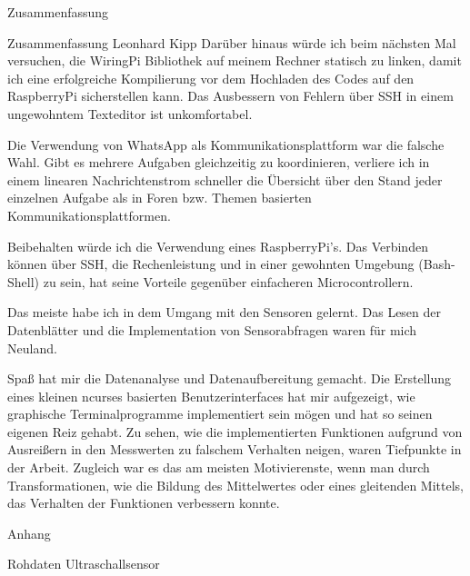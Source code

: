 \documentclass[12pt]{report}
\begin{document}
\begin{section}{Zusammenfassung}
\begin{subsection}{Zusammenfassung Leonhard Kipp}
    Darüber hinaus würde ich beim nächsten Mal versuchen, die WiringPi
    Bibliothek auf meinem Rechner statisch zu linken, damit ich eine
    erfolgreiche Kompilierung vor dem Hochladen des Codes auf den RaspberryPi
    sicherstellen kann. Das Ausbessern von Fehlern über SSH in einem ungewohntem
    Texteditor ist unkomfortabel.

    Die Verwendung von WhatsApp als Kommunikationsplattform war die falsche
    Wahl. Gibt es mehrere Aufgaben gleichzeitig zu koordinieren, verliere ich in
    einem linearen Nachrichtenstrom schneller die Übersicht über den Stand jeder
    einzelnen Aufgabe als in Foren bzw. Themen basierten Kommunikationsplattformen.

    Beibehalten würde ich die Verwendung eines RaspberryPi's. Das Verbinden
    können über SSH, die Rechenleistung und in einer gewohnten Umgebung
    (Bash-Shell) zu sein, hat seine Vorteile gegenüber einfacheren Microcontrollern.

    Das meiste habe ich in dem Umgang mit den Sensoren gelernt. Das Lesen der
    Datenblätter und die Implementation von Sensorabfragen waren für mich Neuland.

    Spaß hat mir die Datenanalyse und Datenaufbereitung gemacht. Die Erstellung
    eines kleinen ncurses basierten Benutzerinterfaces hat mir aufgezeigt, wie
    graphische Terminalprogramme implementiert sein mögen und hat so seinen
    eigenen Reiz gehabt. Zu sehen, wie die implementierten Funktionen
    aufgrund von Ausreißern in den Messwerten zu falschem Verhalten neigen,
    waren Tiefpunkte in der Arbeit. Zugleich war es das am meisten
    Motivierenste, wenn man durch Transformationen, wie die Bildung des
    Mittelwertes oder eines gleitenden Mittels, das Verhalten der Funktionen
    verbessern konnte.
       
  \end{subsection}
\end{section}

\begin{section}{Anhang}
  \begin{subsection}{Rohdaten Ultraschallsensor} \label{ultraschallsensorRohdaten}
    
  \end{subsection}
\end{section}
\end{document}
